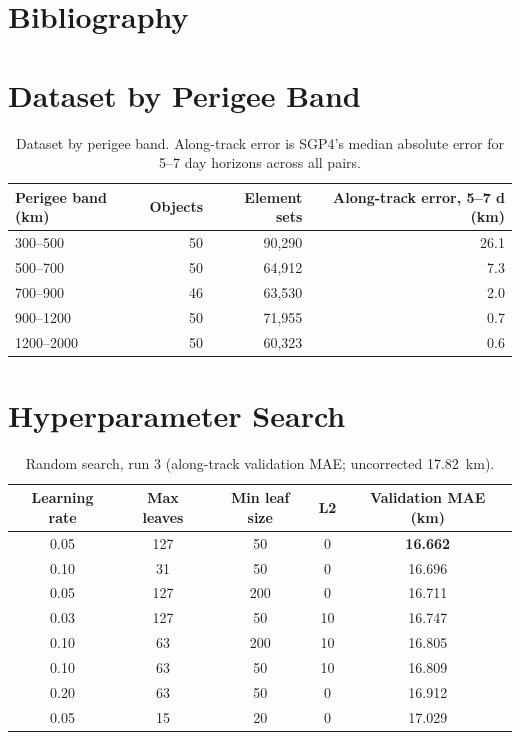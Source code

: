 \documentclass[11pt, a4paper]{article}
\begin{document}
\begin{appendices}

\section{Bibliography}\label{sec:bib}

\printbibliography[heading=none]

\clearpage

\section{Dataset by Perigee Band}\label{app:data}

\begin{table}[htbp]
\centering
\caption{Dataset by perigee band. Along-track error is SGP4's median absolute error for 5--7 day horizons across all pairs.}
\label{tab:data}
\begin{tabular}{lrrr}
\toprule
Perigee band (km) & Objects & Element sets & Along-track error, 5--7 d (km) \\
\midrule
300--500   & 50 & 90,290 & 26.1 \\
500--700   & 50 & 64,912 & 7.3 \\
700--900   & 46 & 63,530 & 2.0 \\
900--1200  & 50 & 71,955 & 0.7 \\
1200--2000 & 50 & 60,323 & 0.6 \\
\bottomrule
\end{tabular}
\end{table}

\section{Hyperparameter Search}\label{app:search}

\begin{table}[htbp]
\centering
\caption{Random search, run 3 (along-track validation MAE; uncorrected 17.82~km).}
\begin{tabular}{ccccc}
\toprule
Learning rate & Max leaves & Min leaf size & L2 & Validation MAE (km) \\
\midrule
0.05 & 127 & 50  & 0  & \textbf{16.662} \\
0.10 & 31  & 50  & 0  & 16.696 \\
0.05 & 127 & 200 & 0  & 16.711 \\
0.03 & 127 & 50  & 10 & 16.747 \\
0.10 & 63  & 200 & 10 & 16.805 \\
0.10 & 63  & 50  & 10 & 16.809 \\
0.20 & 63  & 50  & 0  & 16.912 \\
0.05 & 15  & 20  & 0  & 17.029 \\
\bottomrule
\end{tabular}
\end{table}


\end{appendices}
\end{document}

